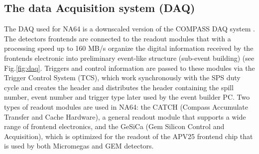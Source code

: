 \subsection{The data Acquisition system (DAQ)}
\label{ch2:sec:daq}

The DAQ used for NA64 is a downscaled version of the COMPASS DAQ system \cite{Bodlak_2013,COMPASS-daq}. The detectors frontends are connected to the readout modules that with a processing speed up to 160 MB/s organize the digital information received by the frontends electronic into preliminary event-like structure (sub-event building) (see Fig.\ref{fig:daq}. Triggers and control information are passed to these modules via the Trigger Control System (TCS), which work synchronously with the SPS duty cycle and creates the header and distributes the header containing the spill number, event number and trigger type later used by the event builder PC. Two types of readout modules are used in NA64: the CATCH (Compass Accumulate Transfer and Cache Hardware), a general readout module that supports a wide range of frontend electronics, and the  GeSiCa (Gem Silicon Control and Acquisition), which is optimized for the readout of the APV25 frontend chip that is used by both Micromegas and GEM detectors.

